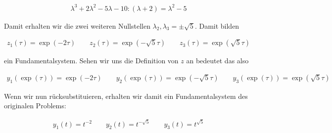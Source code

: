 \begin{solution}
  \begin{align*}
    \lambda^3 + 2\lambda^2 -5\lambda - 10 : (\lambda + 2) = \lambda^2 - 5
  \end{align*}

  Damit erhalten wir die zwei weiteren Nullstellen
  $\lambda_2, \lambda_3 = \pm \sqrt{5}$. Damit bilden

  \begin{align*}
    z_1(\tau)=\exp(-2\tau) \qquad z_2 (\tau)=\exp(-\sqrt{5}\tau) \qquad
    z_3 (\tau)=\exp(\sqrt{5}\tau)
  \end{align*}

  ein Fundamentalsystem. Sehen wir uns die Definition von $z$ an bedeutet das also

  \begin{align*}
    y_1 (\exp(\tau)) = \exp(-2\tau) \qquad y_2 (\exp(\tau))=\exp(-\sqrt{5}\tau) \qquad
    y_3 (\exp(\tau))=\exp(\sqrt{5}\tau)
  \end{align*}

  Wenn wir nun rücksubstituieren, erhalten wir damit ein Fundamentalsystem des originalen
  Problems:

  \begin{align*}
    y_1 (t) = t^{-2} \qquad y_2 (t) = t^{-\sqrt{5}} \qquad y_3 (t) = t^{\sqrt{5}}
  \end{align*}
\end{solution}
